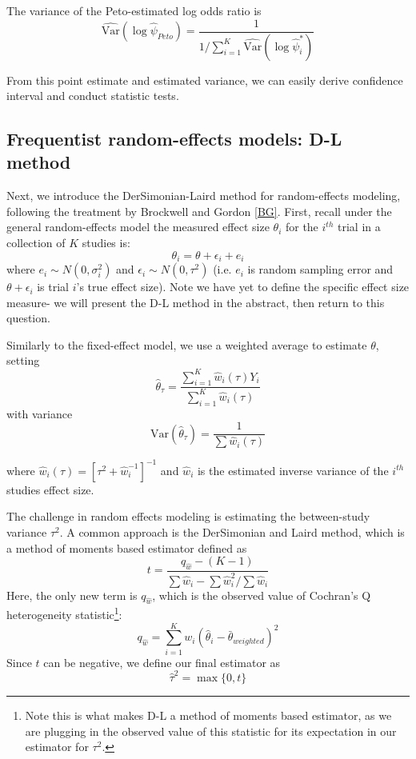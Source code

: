 \documentclass[fleqn,10pt]{SelfArx} %
\begin{document}
The variance of the Peto-estimated log odds ratio is
\[\widehat{\textrm{Var}} (\log \hat{\psi}_{Peto}) = \frac{1}{{1}/{\sum_{i = 1}^K \widehat{\textrm{Var}}( \log \hat{\psi}_i^*)}}\]

From this point estimate and estimated variance, we can easily derive confidence interval and conduct statistic tests. 

\subsection*{Frequentist random-effects models: D-L method}

Next, we introduce the DerSimonian-Laird method for random-effects modeling, following the treatment by Brockwell and Gordon \ref{BG}. First, recall under the general random-effects model the measured effect size $\theta_i$ for the $i^{th}$ trial in a collection of $K$ studies is:
\[\theta_i  = \theta + \epsilon_i + e_i\]
where $e_i \sim N(0, \sigma_i^2)$ and $\epsilon_i \sim N(0, \tau^2)$ (i.e. $e_i$ is random sampling error and $\theta + \epsilon_i$ is trial $i$'s true effect size). Note we have yet to define the specific effect size measure- we will present the D-L method in the abstract, then return to this question. 

Similarly to the fixed-effect model, we use a weighted average to estimate $\theta$, setting
\[\hat{\theta}_\tau =  \frac{\sum_{i = 1}^K \hat{w}_i(\tau) Y_i }{\sum_{i = 1}^K \hat{w}_i(\tau)}\]
with variance
\[\textrm{Var}(\hat{\theta}_\tau) = \frac{1}{\sum\hat{w}_i(\tau)}\]

where $\hat{w}_i(\tau) = [\tau^2 + \hat{w}_i^{-1}]^{-1}$ and $\hat{w}_i$ is the estimated inverse variance of the $i^{th}$ studies effect size.

The challenge in random effects modeling is estimating the between-study variance $\tau^2$. A common approach is the DerSimonian and Laird method, which is a method of moments based estimator defined as 
\[t = \frac{q_{\hat{w}} - (K - 1)}{\sum \hat{w}_i - \sum \hat{w}_i^2/ \sum \hat{w}_i}\]
Here, the only new term is $q_{\hat{w}}$, which is the observed value of Cochran's Q heterogeneity statistic\footnote{Note this is what makes D-L a method of moments based estimator, as we are plugging in the observed value of this statistic for its expectation in our estimator for $\tau^2$.}\cite{HTDA}:
\[q_{\hat{w}} = \sum_{i = 1}^K w_i (\hat{\theta}_i - \bar{\theta}_{weighted})^2\]
Since $t$ can be negative, we define our final estimator as
\[\hat{\tau}^2 = \max \{0, t\}\]
\end{document}

